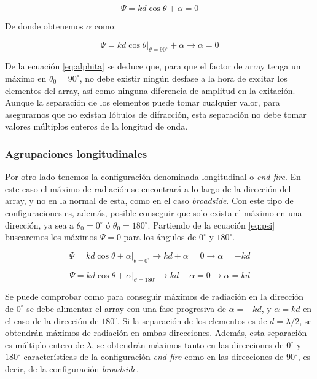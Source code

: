 \begin{equation}
	\Psi=kd\cos\theta+\alpha=0
	\label{eq:nulo}
\end{equation}

\par De donde obtenemos $\alpha$ como: 

\begin{equation}
	\Psi=kd\cos\theta|_{\theta=90^{\circ}} +\alpha\rightarrow  \alpha=0
	\label{eq:alphita}
\end{equation}

\par De la ecuación \ref{eq:alphita} se deduce que, para que el factor de array tenga un máximo en $\theta_{0}=90^{\circ}$, no debe existir ningún desfase a la hora de excitar los elementos del array, así como ninguna diferencia de amplitud en la exitación. Aunque la separación de los elementos puede tomar cualquier valor, para asegurarnos que no existan lóbulos de difracción, esta separación no debe tomar valores múltiplos enteros de la longitud de onda. \cite{Balanis2015}




\subsubsection{Agrupaciones longitudinales}

\par Por otro lado tenemos la configuración denominada longitudinal o \textit{end-fire}. En este caso el máximo de radiación se encontrará a lo largo de la dirección del array, y no en la normal de esta, como en el caso \textit{broadside}. Con este tipo de configuraciones es, además, posible conseguir que solo exista el máximo en una dirección, ya sea a $\theta_{0}=0^{\circ}$ ó $\theta_{0}=180^{\circ}$. Partiendo de la ecuación \ref{eq:psi} buscaremos los máximos $\Psi=0$ para los ángulos de $0^{\circ}$ y $180^{\circ}$.   \cite{Balanis2015}

\begin{equation}
	\Psi = kd\cos\theta+\alpha|_{\theta=0^{\circ}}\rightarrow kd+\alpha=0\rightarrow \alpha=-kd
	\label{eq:end1}
\end{equation}

\begin{equation}
	\Psi = kd\cos\theta+\alpha|_{\theta=180^{\circ}}\rightarrow kd+\alpha=0\rightarrow \alpha=kd
	\label{eq:end2}
\end{equation}

\par Se puede comprobar como para conseguir máximos de radiación en la dirección de $0^{\circ}$ se debe alimentar el array con una fase progresiva de $\alpha=-kd$, y $\alpha=kd$ en el caso de la dirección de $180^{\circ}$. Si la separación de los elementos es de $d=\lambda/2$, se obtendrán máximos de radiación en ambas direcciones. Además, esta separación es múltiplo entero de $\lambda$, se obtendrán máximos tanto en las direcciones de $0^{\circ}$ y $180^{\circ}$ características de la configuración \textit{end-fire} como en las direcciones de
$90^{\circ}$, es decir, de la configuración \textit{broadside}. \cite{Balanis2015}


